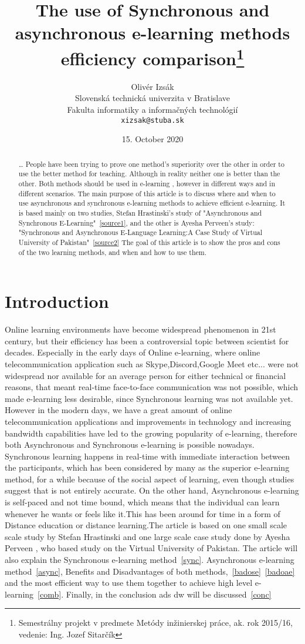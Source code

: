 \documentclass[10pt,twoside,english,a4paper]{article}
\title{The use of Synchronous and asynchronous e-learning methods efficiency comparison\thanks{Semestrálny projekt v predmete Metódy inžinierskej práce, ak. rok 2015/16, vedenie: 	
Ing. Jozef Sitarčík}} %
\author{Olivér Izsák\\[2pt]
	{\small Slovenská technická univerzita v Bratislave}\\
	{\small Fakulta informatiky a informačných technológií}\\
	{\small \texttt{xizsak@stuba.sk}}
	}
\date{\small 15. October 2020}
\begin{document}
\maketitle

\begin{abstract}
\ldots
People have been trying to prove one method's superiority over the other in order to use the better method for teaching.
Although in reality neither one is better than the other. Both methods should be used in e-learning , however
in different ways  and in different scenarios. The main purpose of this article is to discuss  where and when to use asynchronous and
synchronous e-learning methods to achieve efficient e-learning. It is based mainly on two studies, Stefan Hrastinski's study of "Asynchronous and Synchronous E-Learning"~\ref{source1}, and the other is Ayesha Perveen's study: "Synchronous and Asynchronous E-Language Learning:A Case Study of Virtual University of Pakistan"~\ref{source2}
The goal of this article is to show the pros and cons of the two learning methods, and when and how to use them.
\end{abstract}



\section{Introduction} \label{intro}

Online learning environments have become widespread phenomenon in 21st century, but their efficiency has been a controversial topic between scientist for decades. Especially in the early days of Online e-learning, where online telecommunication application such as Skype,Discord,Google Meet etc... were not widespread nor available for an average person for either technical or financial reasons,  that meant real-time face-to-face communication was not possible, which made e-learning less desirable, since Synchronous learning was not available yet. However in the modern days, we have a great amount of online telecommunication applications and improvements in technology and increasing bandwidth capabilities have led to the growing popularity of e-learning, therefore both Asynchronous and Synchronous e-learning is possible nowadays.
Synchronous learning happens in real-time with immediate interaction between the participants, which has been considered by many as the superior e-learning method, for a while because of the social aspect of learning, even though studies suggest that is not entirely accurate.
On the other hand, Asynchronous e-learning is self-paced and not time bound, which means that the individual can learn whenever he wants or feels like it.This has been around for time in a form of Distance education or distance learning.The article is based on one small scale scale study by Stefan Hrastinski and one large scale case study done by Ayesha Perveen , who based study on the Virtual University of Pakistan. The article will also explain the Synchronous e-learning method~\ref{sync}.
Asynchronous e-learning method~\ref{async}, Benefits and Disadvantages of both methods,~\ref{badose}~\ref{badoae}
and the most efficient way to use them together to achieve high level e-learning~\ref{comb}. 
Finally, in the conclusion ads dw will be discussed~\ref{conc}
\end{document}
